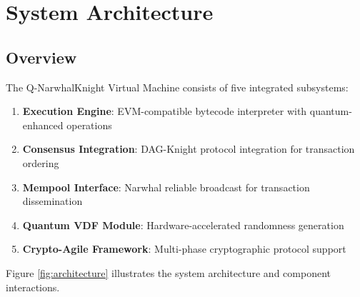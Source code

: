 \documentclass[11pt]{article}
\begin{document}
\section{System Architecture}

\subsection{Overview}

The Q-NarwhalKnight Virtual Machine consists of five integrated subsystems:

\begin{enumerate}
    \item \textbf{Execution Engine}: EVM-compatible bytecode interpreter with quantum-enhanced operations
    \item \textbf{Consensus Integration}: DAG-Knight protocol integration for transaction ordering
    \item \textbf{Mempool Interface}: Narwhal reliable broadcast for transaction dissemination
    \item \textbf{Quantum VDF Module}: Hardware-accelerated randomness generation
    \item \textbf{Crypto-Agile Framework}: Multi-phase cryptographic protocol support
\end{enumerate}

Figure \ref{fig:architecture} illustrates the system architecture and component interactions.
\end{document}
